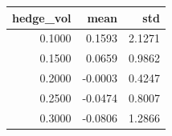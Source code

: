 \begin{tabular}{rrr}
\toprule
hedge_vol & mean & std \\
\midrule
0.1000 & 0.1593 & 2.1271 \\
0.1500 & 0.0659 & 0.9862 \\
0.2000 & -0.0003 & 0.4247 \\
0.2500 & -0.0474 & 0.8007 \\
0.3000 & -0.0806 & 1.2866 \\
\bottomrule
\end{tabular}

